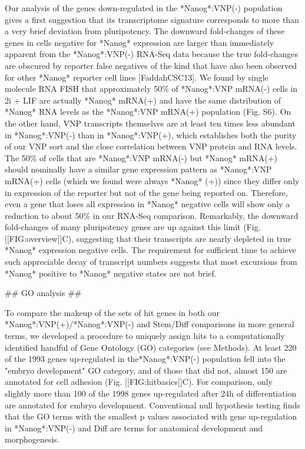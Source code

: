 \documentclass[aps,prl,twocolumn,superscriptaddress]{revtex4}
\begin{document}
Our analysis of the genes down-regulated in the *Nanog*:VNP(-) population gives a first suggestion that its transcriptome signature corresponds to more than a very brief deviation from pluripotency. The downward fold-changes of these genes in cells negative for  *Nanog* expression are larger than immediately apparent from the *Nanog*:VNP(-) RNA-Seq data because the true fold-changes are obscured by reporter false negatives of the kind that have also been observed for other *Nanog* reporter cell lines [FaddahCSC13]. We found by single molecule RNA FISH that approximately 50\% of *Nanog*:VNP mRNA(-) cells in 2i + LIF are actually *Nanog* mRNA(+) and have the same distribution of *Nanog* RNA levels as the *Nanog*:VNP mRNA(+) population (Fig. S6). On the other hand, VNP transcripts themselves are at least ten times less abundant in *Nanog*:VNP(-) than in *Nanog*:VNP(+), which establishes both the purity of our VNP sort and the close correlation between VNP protein and RNA levels. The 50\% of cells that are *Nanog*:VNP mRNA(-) but *Nanog* mRNA(+) should nominally have a similar gene expression pattern as *Nanog*:VNP mRNA(+) cells (which we found were always *Nanog* (+)) since they differ only in expression of the reporter but not of the gene being reported on. Therefore, even a gene that loses all expression in *Nanog* negative cells will show only a reduction to about 50\% in our RNA-Seq comparison. Remarkably, the downward fold-changes of many pluripotency genes are up against this limit (Fig. [[FIG:overview]]C), suggesting that their transcripts are nearly depleted in true *Nanog* expression negative cells. The requirement for sufficient time to achieve such appreciable decay of transcript numbers suggests that most excursions from *Nanog* positive to *Nanog* negative states are not brief.







## GO analysis ##

To compare the makeup of the sets of hit genes in both our *Nanog*:VNP(+)/*Nanog*:VNP(-) and Stem/Diff comparisons in more general terms, we developed a procedure to uniquely assign hits to a computationally identified handful of Gene Ontology (GO) categories (see Methods). At least 220 of the 1993 genes up-regulated in the*Nanog*:VNP(-) population fell into the "embryo development" GO category, and of those that did not, almost 150 are annotated for cell adhesion (Fig. [[FIG:hitbasics]]C).
For comparison, only slightly more than 100 of the 1998 genes up-regulated after 24h of differentiation are annotated for embryo development. 
Conventional null hypothesis testing finds that the GO terms with the smallest p values associated with gene up-regulation in *Nanog*:VNP(-) and Diff are terms for anatomical development and morphogenesis.
\end{document}
